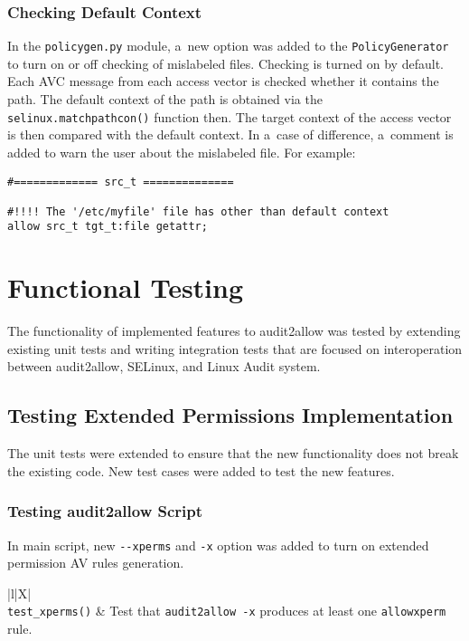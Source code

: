 \subsection{Checking Default Context}
In the \texttt{policygen.py} module, a~new option was added to the
\texttt{PolicyGenerator} to turn on or off checking of mislabeled files.
Checking is turned on by default. Each AVC message from each access vector is
checked whether it contains the path. The default context of the path is
obtained via the \texttt{selinux.matchpathcon()} function then. The target
context of the access vector is then compared with the default context. In
a~case of difference, a~comment is added to warn the user about the mislabeled
file. For example:
\begin{lstlisting}
#============= src_t ==============

#!!!! The '/etc/myfile' file has other than default context
allow src_t tgt_t:file getattr;
\end{lstlisting}

\chapter{Functional Testing}
\label{testing}
The functionality of implemented features to audit2allow was tested by extending
existing unit tests and writing integration tests that are focused on
interoperation between audit2allow, SELinux, and Linux Audit system.

\section{Testing Extended Permissions Implementation}
The unit tests were extended to ensure that the new functionality does not break
the existing code. New test cases were added to test the new features.

\subsection{Testing audit2allow Script}
In main script, new \texttt{-{}-xperms} and \texttt{-x} option was added to turn
on extended permission AV rules generation.
\tabulinesep=5pt

\begin{longtabu}{|l|X|} \hline
    \\ \hline
    \texttt{test\_xperms()} & Test that \texttt{audit2allow -x}
    produces at least one \texttt{allowxperm} rule. \\ \hline
\end{longtabu}

